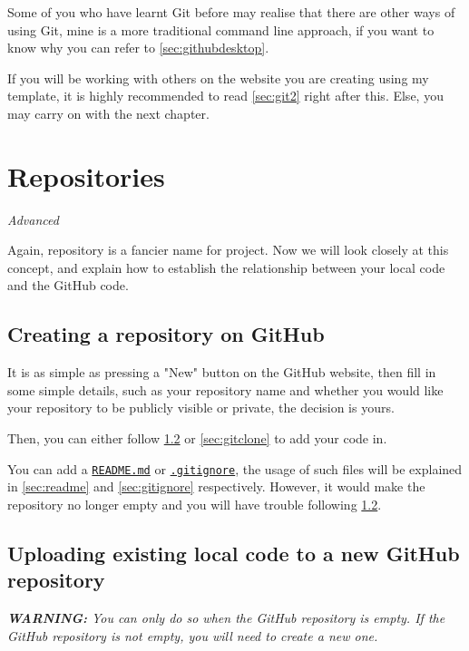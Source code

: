 Some of you who have learnt Git before may realise that there are other ways of using Git, mine is a more traditional command line approach, if you want to know why you can refer to \cref{sec:githubdesktop}.
\vspace{6mm}

If you will be working with others on the website you are creating using my template, it is highly recommended to read \cref{sec:git2} right after this. Else, you may carry on with the next chapter.
\section{Repositories}

\textit{Advanced}
\vspace{6mm}

Again, repository is a fancier name for project. Now we will look closely at this concept, and explain how to establish the relationship between your local code and the GitHub code.

\subsection{Creating a repository on GitHub}
\label{sec:gituploadgithub}

It is as simple as pressing a "New" button on the GitHub website, then fill in some simple details, such as your repository name and whether you would like your repository to be publicly visible or private, the decision is yours.

Then, you can either follow \cref{sec:gitinit} or \cref{sec:gitclone} to add your code in. 

You can add a \hyperref[sec:readme]{\texttt{README.md}} or \hyperref[sec:gitignore]{\texttt{.gitignore}}, the usage of such files will be explained in \cref{sec:readme} and \cref{sec:gitignore} respectively. However, it would make the repository no longer empty and you will have trouble following \cref{sec:gitinit}.

\subsection{Uploading existing local code to a new GitHub repository}
\label{sec:gitinit} 

\textit{\textbf{WARNING: } You can only do so when the GitHub repository is empty. If the GitHub repository is not empty, you will need to create a new one.}
\vspace{6mm}

